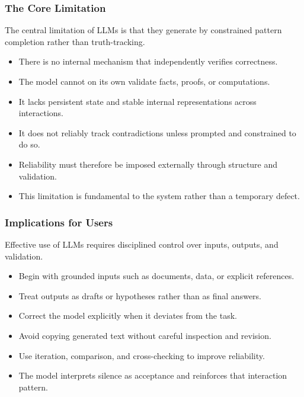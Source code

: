 \documentclass{beamer}
\begin{document}
\frame
{
   \frametitle{The Core Limitation}

    The central limitation of LLMs is that they generate by constrained pattern completion rather than truth-tracking.

    \begin{itemize}
        \item There is no internal mechanism that independently verifies correctness.
        \item The model cannot on its own validate facts, proofs, or computations.
        \item It lacks persistent state and stable internal representations across interactions.
        \item It does not reliably track contradictions unless prompted and constrained to do so.
        \item Reliability must therefore be imposed externally through structure and validation.
        \item This limitation is fundamental to the system rather than a temporary defect.
    \end{itemize}
}

\frame
{
   \frametitle{Implications for Users}

    Effective use of LLMs requires disciplined control over inputs, outputs, and validation.

    \begin{itemize}
        \item Begin with grounded inputs such as documents, data, or explicit references.
        \item Treat outputs as drafts or hypotheses rather than as final answers.
        \item Correct the model explicitly when it deviates from the task.
        \item Avoid copying generated text without careful inspection and revision.
        \item Use iteration, comparison, and cross-checking to improve reliability.
        \item The model interprets silence as acceptance and reinforces that interaction pattern.
    \end{itemize}
}
\end{document}
